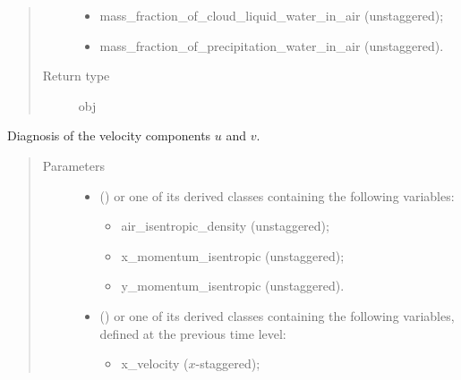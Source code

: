 \documentclass[letterpaper,10pt,english]{sphinxmanual}
\begin{document}
\begin{fulllineitems}
\begin{fulllineitems}
\begin{quote}
\begin{description}
\begin{itemize}
\item {} 
mass\_fraction\_of\_cloud\_liquid\_water\_in\_air (unstaggered);

\item {} 
mass\_fraction\_of\_precipitation\_water\_in\_air (unstaggered).

\end{itemize}


\item[{Return type}] \leavevmode
obj

\end{description}\end{quote}

\end{fulllineitems}


\begin{fulllineitems}
\label{\detokenize{api:tasmania.dycore.diagnostic_isentropic.DiagnosticIsentropic.get_velocity_components}}
Diagnosis of the velocity components \(u\) and \(v\).
\begin{quote}\begin{description}
\item[{Parameters}] \leavevmode\begin{itemize}
\item {} 
 () \textendash{} 
{\hyperref[\detokenize{api:tasmania.storages.grid_data.GridData}]{}} or one of its derived classes containing the following variables:
\begin{itemize}
\item {} 
air\_isentropic\_density (unstaggered);

\item {} 
x\_momentum\_isentropic (unstaggered);

\item {} 
y\_momentum\_isentropic (unstaggered).

\end{itemize}


\item {} 
 () \textendash{} 
{\hyperref[\detokenize{api:tasmania.storages.grid_data.GridData}]{}} or one of its derived classes containing the following variables,
defined at the previous time level:
\begin{itemize}
\item {} 
x\_velocity (\(x\)-staggered);


\end{itemize}
\end{itemize}
\end{description}
\end{quote}
\end{fulllineitems}
\end{fulllineitems}
\end{document}
